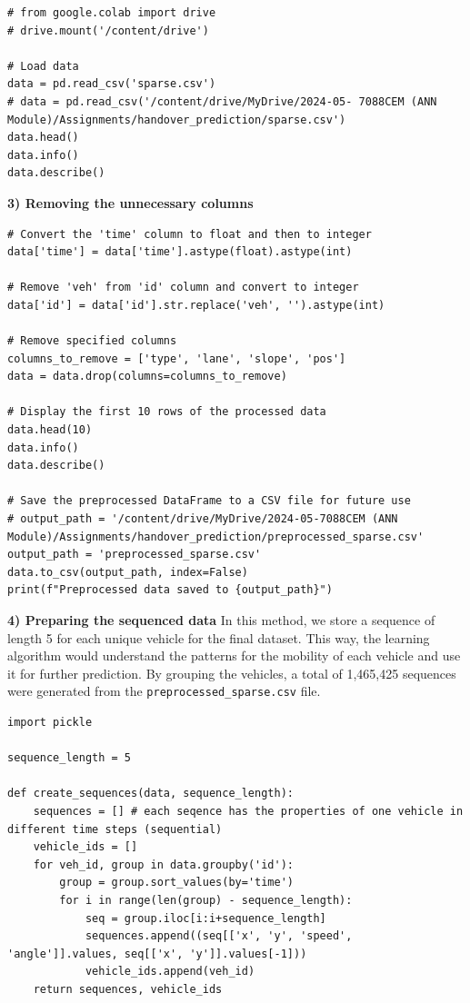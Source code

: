 \documentclass[journal,onecolumn]{IEEEtran}
\begin{document}
{\begin{appendices}
\begin{verbatim}
# from google.colab import drive
# drive.mount('/content/drive')

# Load data
data = pd.read_csv('sparse.csv')
# data = pd.read_csv('/content/drive/MyDrive/2024-05- 7088CEM (ANN Module)/Assignments/handover_prediction/sparse.csv')
data.head()
data.info()
data.describe()
\end{verbatim}

\textbf{3) Removing the unnecessary columns}
\begin{verbatim}
# Convert the 'time' column to float and then to integer
data['time'] = data['time'].astype(float).astype(int)

# Remove 'veh' from 'id' column and convert to integer
data['id'] = data['id'].str.replace('veh', '').astype(int)

# Remove specified columns
columns_to_remove = ['type', 'lane', 'slope', 'pos']
data = data.drop(columns=columns_to_remove)

# Display the first 10 rows of the processed data
data.head(10)
data.info()
data.describe()

# Save the preprocessed DataFrame to a CSV file for future use
# output_path = '/content/drive/MyDrive/2024-05-7088CEM (ANN Module)/Assignments/handover_prediction/preprocessed_sparse.csv'
output_path = 'preprocessed_sparse.csv'
data.to_csv(output_path, index=False)
print(f"Preprocessed data saved to {output_path}")
\end{verbatim}

\textbf{4) Preparing the sequenced data}
In this method, we store a sequence of length 5 for each unique vehicle for the final dataset. This way, the learning algorithm would understand the patterns for the mobility of each vehicle and use it for further prediction. By grouping the vehicles, a total of 1,465,425 sequences were generated from the \texttt{preprocessed\_sparse.csv} file. 

\begin{verbatim}
import pickle

sequence_length = 5

def create_sequences(data, sequence_length):
    sequences = [] # each seqence has the properties of one vehicle in different time steps (sequential)
    vehicle_ids = []
    for veh_id, group in data.groupby('id'):
        group = group.sort_values(by='time')
        for i in range(len(group) - sequence_length):
            seq = group.iloc[i:i+sequence_length]
            sequences.append((seq[['x', 'y', 'speed', 'angle']].values, seq[['x', 'y']].values[-1]))
            vehicle_ids.append(veh_id)
    return sequences, vehicle_ids


\end{verbatim}
\end{appendices}}
\end{document}
